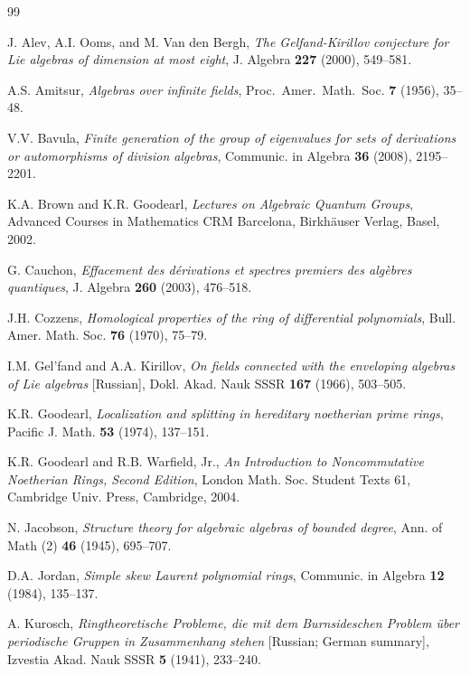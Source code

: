 \documentclass{conm-p-l}
\theoremstyle{definition}
\theoremstyle{remark}
\numberwithin{equation}{section}
\begin{document}

\begin{thebibliography}{99}

 J. Alev, A.I. Ooms, and M. Van den Bergh, \emph{The Gelfand-Kirillov conjecture for Lie algebras of dimension at most eight}, J. Algebra \textbf{227} (2000), 549--581.

 A.S. Amitsur, \emph{Algebras over infinite fields}, Proc.~Amer.~Math.~Soc. \textbf{7} (1956), 35--48.

 V.V. Bavula, \emph{Finite generation of the group of eigenvalues for sets of derivations or automorphisms of division algebras}, Communic. in Algebra \textbf{36} (2008), 2195--2201.

 K.A. Brown and K.R. Goodearl, \emph{Lectures on Algebraic
    Quantum Groups}, Advanced Courses in Mathematics CRM Barcelona,
  Birkh\"auser Verlag, Basel, 2002.

G. Cauchon, \emph{Effacement des d\'erivations et spectres premiers des alg\`ebres quantiques},  J. Algebra \textbf{260} (2003), 476--518.

 J.H. Cozzens, \emph{Homological properties of the ring of differential polynomials}, Bull. Amer. Math. Soc. \textbf{76} (1970), 75--79.

 I.M. Gel'fand and A.A. Kirillov, \emph{On fields connected with the enveloping algebras of Lie algebras} [Russian], Dokl. Akad. Nauk SSSR \textbf{167} (1966), 503--505.

 K.R. Goodearl, \emph{Localization and splitting in hereditary noetherian prime rings}, Pacific J. Math. \textbf{53} (1974), 137--151.

 K.R. Goodearl and R.B. Warfield, Jr., \emph{An
    Introduction to Noncommutative Noetherian Rings, Second Edition},
  London Math. Soc. Student Texts 61, Cambridge Univ.
  Press, Cambridge, 2004.

 N. Jacobson, \emph{Structure theory for algebraic algebras of bounded degree}, Ann. of Math (2) \textbf{46} (1945), 695--707.

 D.A. Jordan, \emph{Simple skew Laurent polynomial rings}, Communic. in Algebra \textbf{12} (1984), 135--137.

 A. Kurosch, \emph{Ringtheoretische Probleme, die mit dem Burnsideschen Problem \"uber periodische Gruppen in Zusammenhang stehen} [Russian; German summary], Izvestia Akad. Nauk SSSR \textbf{5} (1941), 233--240.


\end{thebibliography}
\end{document}
